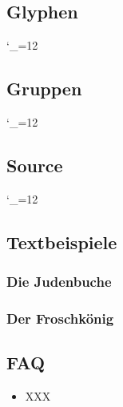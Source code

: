 \documentclass{fontdoku}
\begin{document}
\newpage
\subsection{Glyphen}

{%
\setlength{\columnseprule}{.5pt}
\setlength{\columnsep}{1cm}
\begin{multicols}{3}
   \newcommand{\GYLPHNAME}[1]{\sindex[glyph]{#1}%
   \makebox[3cm][l]{\hypertarget{glyph.#1}{}\hyperlink{gglyph.#1}{#1}}\hfill%
   {\Huge\fbox{\Lglyph{#1}\strut}}\hfill\mbox{}\newline}
   \catcode`\_=12%
\end{multicols}
}


\newpage
\subsection{Gruppen}
{\setlength{\columnseprule}{.5pt}
\setlength{\columnsep}{1cm}
\catcode`\_=12%
\newcommand{\GROUPHEAD}[1]{\begin{multicols}{3}[\subsubsection{#1}]}
\newcommand{\GROUPFOOT}{\end{multicols}}
\newcommand{\GROUPGLYPH}[2]{\sindex[glyph]{#2}%
   \makebox[3cm][l]{\hyperlink{glyph.#2}{#2}\hypertarget{gglyph.#2}{}{ \small(0x#1)}}%
   \hfill{\Huge\Lglyph{#2}\strut}\hfill\mbox{}\newline}
}

\newpage
\subsection{Source}



\newpage
{}
%
{\catcode`\_=12%
\def\indexcolumn{4}%
\printindex[glyph]
}
\printindex[idx]

\newpage
\subsection{Textbeispiele}

\subsubsection{Die Judenbuche}
{\color{purple}

}
\newpage
\subsubsection{Der Froschkönig}
{\color{purple}

}

\newpage
\subsection{FAQ}

\begin{itemize}
   \item XXX
\end{itemize}
\end{document}
